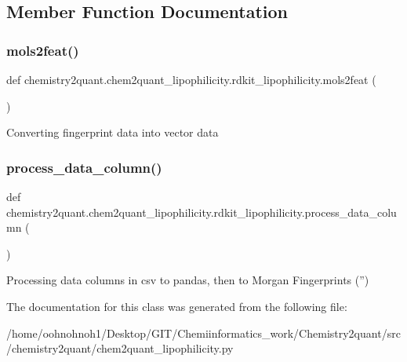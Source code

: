 \subsection{Member Function Documentation}
\mbox{\label{classchemistry2quant_1_1chem2quant__lipophilicity_1_1rdkit__lipophilicity_a0529318f2021adfc7004f786ac98848d}}
\subsubsection{\texorpdfstring{mols2feat()}{mols2feat()}}
{\footnotesize\ttfamily def chemistry2quant.\+chem2quant\+\_\+lipophilicity.\+rdkit\+\_\+lipophilicity.\+mols2feat (\begin{DoxyParamCaption}{ }\end{DoxyParamCaption})}

\begin{DoxyVerb}Converting fingerprint data into vector data
\end{DoxyVerb}
 \mbox{\label{classchemistry2quant_1_1chem2quant__lipophilicity_1_1rdkit__lipophilicity_a46c111c55d4619ab2865950b46d6c361}}
\subsubsection{\texorpdfstring{process\+\_\+data\+\_\+column()}{process\_data\_column()}}
{\footnotesize\ttfamily def chemistry2quant.\+chem2quant\+\_\+lipophilicity.\+rdkit\+\_\+lipophilicity.\+process\+\_\+data\+\_\+column (\begin{DoxyParamCaption}{ }\end{DoxyParamCaption})}

\begin{DoxyVerb}Processing data columns in csv to pandas, then to Morgan Fingerprints ('')
\end{DoxyVerb}


The documentation for this class was generated from the following file\+:\begin{DoxyCompactItemize}
\item
/home/oohnohnoh1/\+Desktop/\+G\+I\+T/\+Chemiinformatics\+\_\+work/\+Chemistry2quant/src/chemistry2quant/chem2quant\+\_\+lipophilicity.\+py\end{DoxyCompactItemize}
